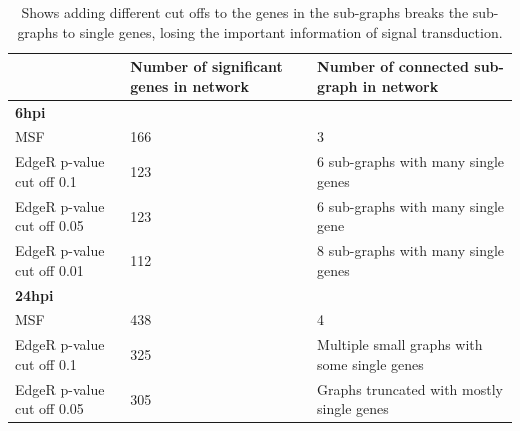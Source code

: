 \documentclass[10pt,a4paper,twocolumn]{article}
\begin{document}
\begin{table}[]
	\centering
	\caption{Shows adding different cut offs to the genes in the sub-graphs breaks the sub-graphs to single genes, losing the important information of signal transduction. }
	\label{my-label}
	\begin{tabular}{lll}
		\hline
		\multicolumn{1}{|l|}{}                           & \multicolumn{1}{l|}{\textbf{Number of significant genes in network}} & \multicolumn{1}{l|}{\textbf{Number of connected sub-graph in network}} \\ \hline
		\multicolumn{1}{|l|}{\textbf{6hpi}}              & \multicolumn{1}{l|}{}                                                & \multicolumn{1}{l|}{}                                                  \\ \hline
		\multicolumn{1}{|l|}{MSF}                        & \multicolumn{1}{l|}{166}                                             & \multicolumn{1}{l|}{3}                                                 \\ \hline
		\multicolumn{1}{|l|}{EdgeR p-value cut off 0.1}  & \multicolumn{1}{l|}{123}                                             & \multicolumn{1}{l|}{6 sub-graphs with many single genes}               \\ \hline
		\multicolumn{1}{|l|}{EdgeR p-value cut off 0.05} & \multicolumn{1}{l|}{123}                                             & \multicolumn{1}{l|}{6 sub-graphs with many single gene}                \\ \hline
		\multicolumn{1}{|l|}{EdgeR p-value cut off 0.01} & \multicolumn{1}{l|}{112}                                             & \multicolumn{1}{l|}{8 sub-graphs with many single genes}               \\ \hline
		\multicolumn{1}{|l|}{\textbf{24hpi}}             & \multicolumn{1}{l|}{}                                                & \multicolumn{1}{l|}{}                                                  \\ \hline
		\multicolumn{1}{|l|}{MSF}                        & \multicolumn{1}{l|}{438}                                             & \multicolumn{1}{l|}{4}                                                 \\ \hline
		\multicolumn{1}{|l|}{EdgeR p-value cut off 0.1}  & \multicolumn{1}{l|}{325}                                             & \multicolumn{1}{l|}{Multiple small graphs with some single genes}      \\ \hline
		\multicolumn{1}{|l|}{EdgeR p-value cut off 0.05} & \multicolumn{1}{l|}{305}                                             & \multicolumn{1}{l|}{Graphs truncated with mostly single genes}         \\ \hline

\end{tabular}
\end{table}
\end{document}
